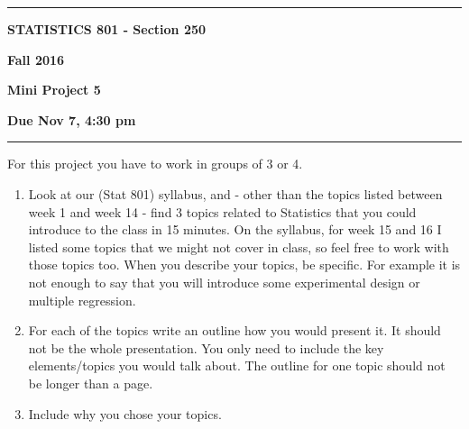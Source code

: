 \documentclass[12pt]{article}
\begin{document}
\hrule
\medskip
\centerline{\textbf{STATISTICS 801 - Section 250}}\hfill \textbf{Fall 2016}
\centerline{\textbf{Mini Project 5}}
\centerline{\textbf{Due Nov 7, 4:30 pm}}
\smallskip
\hrule
For this project you have to work in groups of 3 or 4.
\begin{enumerate}
\item Look at our (Stat 801) syllabus, and - other than the topics listed between week 1 and week 14 - find 3 topics related to Statistics that you could introduce to the class in 15 minutes. On the syllabus, for week 15 and 16 I listed some topics that we might not cover in class, so feel free to work with those topics too.  When you describe your topics, be specific. For example it is not enough to say that you will introduce some experimental design or multiple regression.
\item For each of the topics write an outline how you would present it. It should not be the whole presentation. You only need to include the key elements/topics you would talk about. The outline for one topic should not be longer than a page.
\item Include why you chose your topics.
\end{enumerate}
\end{document}
